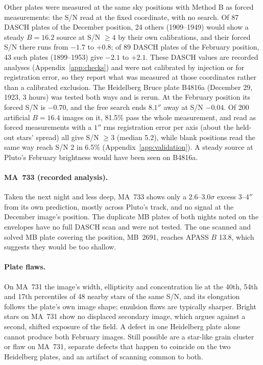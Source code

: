\documentclass[11pt]{article}
\begin{document}
\begin{appendices}
Other plates were measured at the same sky positions with Method B as forced measurements: the S/N read at the fixed coordinate, with no search. Of 87 DASCH plates of the December position, 24 others (1909--1949) would show a steady $B=16.2$ source at S/N $\ge4$ by their own calibrations, and their forced S/N there runs from $-1.7$ to $+0.8$; of 89 DASCH plates of the February position, 43 such plates (1899--1953) give $-2.1$ to $+2.1$. These DASCH values are recorded analyses (Appendix~\ref{app:checks}) and were not calibrated by injection or for registration error, so they report what was measured at those coordinates rather than a calibrated exclusion. The Heidelberg Bruce plate B4816a (December 29, 1923, 3 hours) was tested both ways and is rerun. At the February position its forced S/N is $-0.70$, and the free search ends $8.1''$ away at S/N $-0.04$. Of 200 artificial $B=16.4$ images on it, 81.5\% pass the whole measurement, and read as forced measurements with a $1''$ rms registration error per axis (about the held-out stars' spread) all give S/N $\ge3$ (median 5.2), while blank positions read the same way reach S/N 2 in 6.5\% (Appendix~\ref{app:validation}). A steady source at Pluto's February brightness would have been seen on B4816a.

\paragraph{MA~733 (recorded analysis).} Taken the next night and less deep, MA~733 shows only a 2.6--3.0$\sigma$ excess 3--4$''$ from its own prediction, mostly across Pluto's track, and no signal at the December image's position. The duplicate MB plates of both nights noted on the envelopes have no full DASCH scan and were not tested. The one scanned and solved MB plate covering the position, MB~2691, reaches APASS $B$ 13.8, which suggests they would be too shallow.

\paragraph{Plate flaws.}
On MA~731 the image's width, ellipticity and concentration lie at the 40th, 54th and 17th percentiles of 48 nearby stars of the same S/N, and its elongation follows the plate's own image shape; emulsion flaws are typically sharper. Bright stars on MA~731 show no displaced secondary image, which argues against a second, shifted exposure of the field. A defect in one Heidelberg plate alone cannot produce both February images. Still possible are a star-like grain cluster or flaw on MA~731, separate defects that happen to coincide on the two Heidelberg plates, and an artifact of scanning common to both.


\end{appendices}
\end{document}
